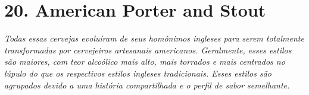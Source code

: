 \section*{20. American Porter and Stout}
\textit{Todas essas cervejas evoluíram de seus homônimos ingleses para serem totalmente transformadas por cervejeiros artesanais americanos. Geralmente, esses estilos são maiores, com teor alcoólico mais alto, mais torrados e mais centrados no lúpulo do que os respectivos estilos ingleses tradicionais. Esses estilos são agrupados devido a uma história compartilhada e o perfil de sabor semelhante.}
